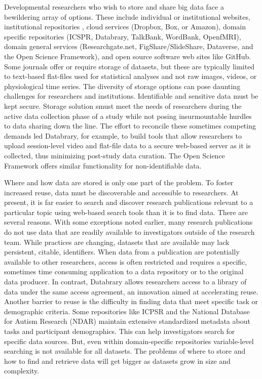 \documentclass[letterpaper,man,apacite]{apa6}
\begin{document}
Developmental researchers who wish to store and share big data face a bewildering array of options.
These include individual or institutional websites, institutional repositories \cite{ScholarSphere}, cloud services (Dropbox, Box, or Amazon), domain specific repositories (ICSPR, Databrary, TalkBank, WordBank, OpenfMRI), domain general services (Researchgate.net, FigShare/SlideShare, Dataverse, and the Open Science Framework), and open source software web sites like GitHub.
Some journals offer or require storage of datasets, but these are typically limited to text-based flat-files used for statistical analyses and not raw images, videos, or physiological time series.
The diversity of storage options can pose daunting challenges for researchers and institutions.
Identifiable and sensitive data must be kept secure.
Storage solution smust meet the needs of researchers during the active data collection phase of a study while not posing insurmountable hurdles to data sharing down the line.
The effort to reconcile these sometimes competing demands led Databrary, for example, to build tools that allow researchers to upload session-level video and flat-file data to a secure web-based server as it is collected, thus minimizing post-study data curation.
The Open Science Framework offers similar functionality for non-identifiable data.

Where and how data are stored is only one part of the problem.
To foster increased reuse, data must be discoverable and accessible to researchers.
At present, it is far easier to search and discover research publications relevant to a particular topic using web-based search tools than it is to find data.
There are several reasons.
With some exceptions noted earlier, many research publications do not use data that are readily available to investigators outside of the research team.
While practices are changing, datasets that are available may lack persistent, citable, identifiers.
When data from a publication are potentially available to other researchers, access is often restricted and requires a specific, sometimes time consuming application to a data repository or to the original data producer.
In contrast, Databrary allows researchers access to a library of data under the same access agreement, an innovation aimed at accelerating reuse.
Another barrier to reuse is the difficulty in finding data that meet specific task or demographic criteria.
Some repositories like ICPSR and the National Database for Autism Research (NDAR) maintain extensive standardized metadata about tasks and participant demographics.
This can help investigators search for specific data sources.
But, even within domain-specific repositories variable-level searching is not available for all datasets.
The problems of where to store and how to find and retrieve data will get bigger as datasets grow in size and complexity.
\end{document}
